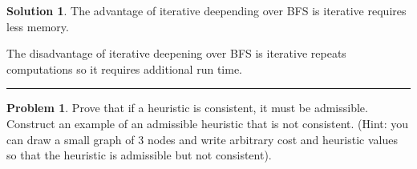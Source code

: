\documentclass{article}
\theoremstyle{definition}
\newtheorem{problem}{Problem}
\def\fline{\rule{0.75\linewidth}{0.5pt}}
\newcommand{\finishline}{\begin{center}\fline\end{center}}
\newtheorem*{solution*}{Solution}
\newenvironment{solution}{\begin{solution*}}{{\finishline} \end{solution*}}
\begin{document}
\begin{solution}
	\item The advantage of iterative deepending over BFS is iterative requires less memory.
	\item The disadvantage of iterative deepening over BFS is iterative repeats computations so it requires additional run time. 

\end{solution}

\begin{problem} %
	Prove that if a heuristic is consistent, it must be admissible. Construct an example of an admissible heuristic that is not consistent. (Hint: you can draw a small graph of 3 nodes and write arbitrary cost and heuristic values so that the heuristic is admissible but not consistent).

\end{problem}
\end{document}
